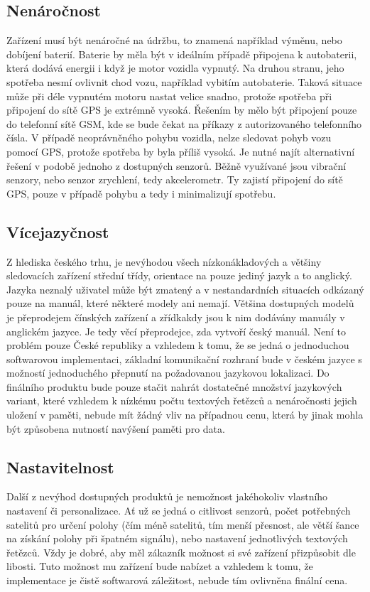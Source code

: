 \documentclass[FM,MP]{tulthesis}  %
\begin{document}
\subsection{Nenáročnost}
Zařízení musí být nenáročné na údržbu, to znamená například výměnu, nebo dobíjení baterií. Baterie by měla být v ideálním případě připojena k autobaterii, která dodává energii i když je motor vozidla vypnutý. Na druhou stranu, jeho spotřeba nesmí ovlivnit chod vozu, například vybitím autobaterie. Taková situace může při déle vypnutém motoru nastat velice snadno, protože spotřeba při připojení do sítě GPS je extrémně vysoká. Řešením by mělo být připojení pouze do telefonní sítě GSM, kde se bude čekat na příkazy z autorizovaného telefonního čísla. V případě neoprávněného pohybu vozidla, nelze sledovat pohyb vozu pomocí GPS, protože spotřeba by byla příliš vysoká. Je nutné najít alternativní řešení v podobě jednoho z dostupných senzorů. Běžně využívané jsou vibrační senzory, nebo senzor zrychlení, tedy akcelerometr. Ty zajistí připojení do sítě GPS, pouze v případě pohybu a tedy i minimalizují spotřebu.

\subsection{Vícejazyčnost}
Z hlediska českého trhu, je nevýhodou všech nízkonákladových a většiny sledovacích zařízení střední třídy, orientace na pouze jediný jazyk a to anglický. Jazyka neznalý uživatel může být zmatený a v nestandardních situacích odkázaný pouze na manuál, které některé modely ani nemají. Většina dostupných modelů je přeprodejem čínských zařízení a zřídkakdy jsou k nim dodávány manuály v anglickém jazyce. Je tedy věcí přeprodejce, zda vytvoří český manuál. Není to problém pouze České republiky a vzhledem k tomu, že se jedná o jednoduchou softwarovou implementaci, základní komunikační rozhraní bude v českém jazyce s možností jednoduchého přepnutí na požadovanou jazykovou lokalizaci. Do finálního produktu bude pouze stačit nahrát dostatečné množství jazykových variant, které vzhledem k nízkému počtu textových řetězců a nenáročnosti jejich uložení v paměti, nebude mít žádný vliv na případnou cenu, která by jinak mohla být způsobena nutností navýšení paměti pro data.

\subsection{Nastavitelnost}
Další z nevýhod dostupných produktů je nemožnost jakéhokoliv vlastního nastavení či personalizace. Ať už se jedná o citlivost senzorů, počet potřebných satelitů pro určení polohy (čím méně satelitů, tím menší přesnost, ale větší šance na získání polohy při špatném signálu), nebo nastavení jednotlivých textových řetězců. Vždy je dobré, aby měl zákazník možnost si své zařízení přizpůsobit dle libosti. Tuto možnost mu zařízení bude nabízet a vzhledem k tomu, že implementace je čistě softwarová záležitost, nebude tím ovlivněna finální cena.
\end{document}

